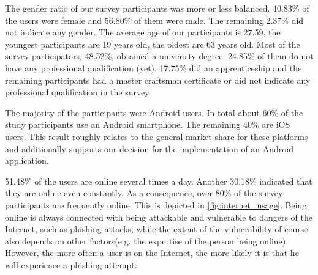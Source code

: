 \begin{description}[leftmargin=0cm]
	\item[General Information] The gender ratio of our survey participants was more or less balanced.
 40.83\% of the users were female and 56.80\% of them were male.
 The remaining 2.37\% did not indicate any gender.
 The average age of our participants is 27.59, the youngest participants are 19 years old, the oldest are 63 years old.
 Most of the survey participators, 48.52\%, obtained a university degree.
 24.85\% of them do not have any professional qualification (yet). 17.75\% did an apprenticeship and the remaining participants had a master craftsman certificate or did not indicate any professional qualification in the survey.
	
	\item[High Rate of Android Users] The majority of the participants were Android users.
 In total about 60\% of the study participants use an Android smartphone.
 The remaining 40\% are iOS users.
 This result roughly relates to the general market share for these platforms and additionally supports our decision for the implementation of an Android application.

	\item[High Internet Usage Frequency] 51.48\% of the users are online several times a day.
 Another 30.18\% indicated that they are online even constantly.
 As a consequence, over 80\% of the survey participants are frequently online.
 This is depicted in \autoref{fig:internet_usage}. Being online is always connected with being attackable and vulnerable to dangers of the Internet, such as phishing attacks, while the extent of the vulnerability of course also depends on other factors(e.g. the expertise of the person being online).
 However, the more often a user is on the Internet, the more likely it is that he will experience a phishing attempt.


\end{description}
